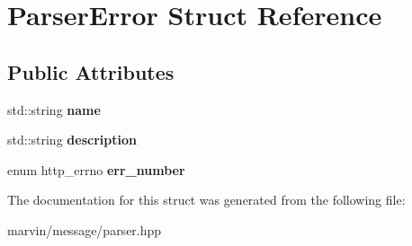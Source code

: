 \hypertarget{struct_parser_error}{}\section{Parser\+Error Struct Reference}
\label{struct_parser_error}
\subsection*{Public Attributes}
\begin{DoxyCompactItemize}
\item 
\mbox{\label{struct_parser_error_ade2aea99ef35e168080b364b44669d8a}} 
std\+::string {\bfseries name}
\item 
\mbox{\label{struct_parser_error_a98c65694d3655ecef0626e6f57322646}} 
std\+::string {\bfseries description}
\item 
\mbox{\label{struct_parser_error_a2f4e2b18fb1f7097ca4751875e589fa7}} 
enum http\+\_\+errno {\bfseries err\+\_\+number}
\end{DoxyCompactItemize}


The documentation for this struct was generated from the following file\+:\begin{DoxyCompactItemize}
\item 
marvin/message/parser.\+hpp\end{DoxyCompactItemize}

